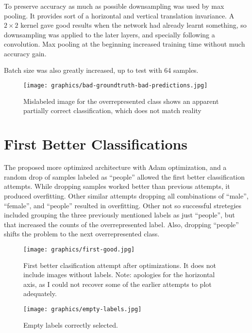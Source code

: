 \documentclass{article}
\begin{document}
To preserve accuracy as much as possible downsampling was used by max pooling. 
It provides sort of a horizontal and vertical translation invariance.
A \(2 \times 2\) kernel gave good results when the network had already learnt something, so downsampling was applied to the later layers, and specially following a convolution.
Max pooling at the beginning increased training time without much accuracy gain.

Batch size was also greatly increased, up to test with 64 samples.

\begin{figure}[ht]
  \centering
  \texttt{[image: graphics/bad-groundtruth-bad-predictions.jpg]}
  \caption{Mislabeled image for the overrepresented class shows an apparent partially correct classification, which does not match reality}
\end{figure}

\section{First Better Classifications}
The proposed more optimized architecture with Adam optimization, and a random drop of samples labeled as ``people'' allowed the first better classification attempts.
While dropping samples worked better than previous attempts, it produced overfitting.
Other similar attempts dropping all combinations of ``male'', ``female'', and ``people'' resulted in overfitting.
Other not so successful stretegies included grouping the three previously mentioned labels as just ``people'', but that increased the counts of the overrepresented label.
Also, dropping ``people'' shifts the problem to the next overrepresented class.


\begin{figure}[ht]
  \centering
  \texttt{[image: graphics/first-good.jpg]}
  \caption{First better clasification attempt after optimizations.
  	It does not include images without labels.
	Note: apologies for the horizontal axis, as I could not recover some of the earlier attempts to plot adequately.}
\end{figure}

\begin{figure}[ht]
  \centering
  \texttt{[image: graphics/empty-labels.jpg]}
  \caption{Empty labels correctly selected.}
\end{figure}
\end{document}
